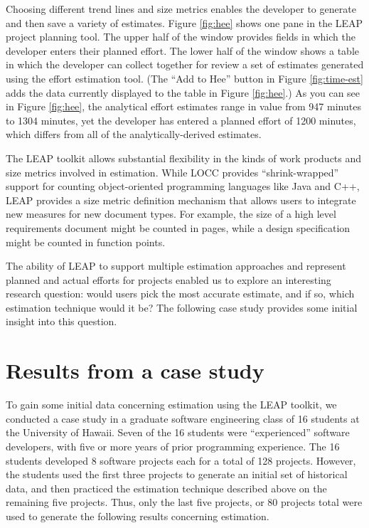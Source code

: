 Choosing different trend lines and size metrics enables the developer
to generate and then save a variety of estimates.
Figure \ref{fig:hee} shows one pane in the LEAP project
planning tool.  The upper half of the window provides fields in which the
developer enters their planned effort. The lower half of the window shows a
table in which the developer can collect together for review a set of
estimates generated using the effort estimation tool. (The ``Add to Hee''
button in Figure \ref{fig:time-est} adds the data currently displayed to
the table in Figure \ref{fig:hee}.)  As you can see in Figure
\ref{fig:hee}, the analytical effort estimates range in value from 947
minutes to 1304 minutes, yet the developer has entered a planned effort of
1200 minutes, which differs from all of the analytically-derived
estimates. 

\begin{figure*}[t]
  {\centerline{}}
  \caption{One pane in the LEAP project plan tool.  The table in the lower
  half of the screen lists the estimates used in coming up with the plan. }
  \label{fig:hee}
\end{figure*}

The LEAP toolkit allows substantial flexibility in the kinds of work
products and size metrics involved in estimation.  While LOCC provides
``shrink-wrapped'' support for counting object-oriented programming
languages like Java and C++, LEAP provides a size metric definition
mechanism that allows users to integrate new measures for new document
types. For example, the size of a high level requirements document might be
counted in pages, while a design specification might be counted in function
points. 

The ability of LEAP to support multiple estimation approaches and represent 
planned and actual efforts for projects enabled us to explore an interesting
research question: would users pick the most accurate estimate, and if so,
which estimation technique would it be?  The following case study provides
some initial insight into this question. 

\section{Results from a case study}

To gain some initial data concerning estimation using the LEAP toolkit, we
conducted a case study in a graduate software engineering class of 16
students at the University of Hawaii.  Seven of the 16 students were
``experienced'' software developers, with five or more years of prior
programming experience. The 16 students developed 8 software projects each
for a total of 128 projects. However, the students used the first three
projects to generate an initial set of historical data, and then practiced
the estimation technique described above on the remaining five projects.
Thus, only the last five projects, or 80 projects total were used to
generate the following results concerning estimation.

